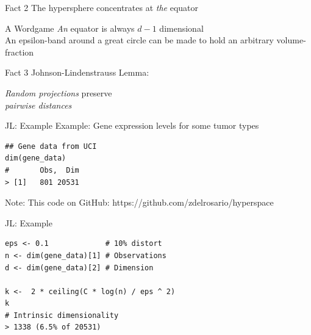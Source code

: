 \documentclass[14pt]{beamer}
\begin{document}

\begin{frame}{Fact 2}
  The hypersphere concentrates at \emph{the} equator
\end{frame}


\begin{frame}{A Wordgame}
  \emph{An} equator is always $d-1$ dimensional \\

  \bigskip An epsilon-band around a great circle can be made to hold an
  arbitrary volume-fraction
\end{frame}


\begin{frame}{Fact 3}
  Johnson-Lindenstrauss Lemma:

  \bigskip \emph{Random projections} preserve \\
  \emph{pairwise distances}
\end{frame}

\begin{frame}[fragile]{JL: Example}
Example: Gene expression levels for some tumor types

\bigskip
  \begin{lstlisting}
## Gene data from UCI
dim(gene_data)
#       Obs,  Dim
> [1]   801 20531
  \end{lstlisting}

  \bigskip
  Note: This code on GitHub: https://github.com/zdelrosario/hyperspace
\end{frame}

\begin{frame}[fragile]{JL: Example}
  \begin{lstlisting}
eps <- 0.1             # 10% distort
n <- dim(gene_data)[1] # Observations
d <- dim(gene_data)[2] # Dimension

k <-  2 * ceiling(C * log(n) / eps ^ 2)
k
# Intrinsic dimensionality
> 1338 (6.5% of 20531)
  \end{lstlisting}
\end{frame}
\end{document}
